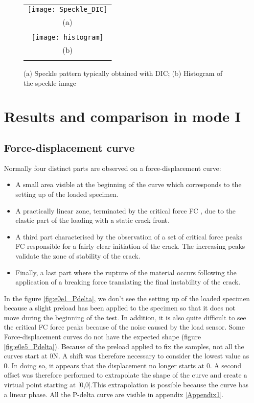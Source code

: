 \begin{figure}[htp]
	\centering
	\begin{tabular}{c}
		\texttt{[image: Speckle\_DIC]} \\
		(a) \\
		\\
		\texttt{[image: histogram]} \\
		(b) \\
		\\
	\end{tabular}
	\caption{(a) Speckle pattern typically obtained with DIC; (b) Histogram of the speckle image}
	\label{fig:Speckle_DIC}
\end{figure}

\section{Results and comparison in mode I}

\subsection{Force-displacement curve}

Normally four distinct parts are observed on a force-displacement curve:

\begin{itemize}
	\item A small area visible at the beginning of the curve which corresponds to the setting up of the loaded specimen. 
	\item A practically linear zone, terminated by the critical force FC , due to the elastic part of the loading with a static crack front.
	\item A third part characterised by the observation of a set of critical force peaks FC responsible for a fairly clear initiation of the crack. The increasing peaks validate the zone of stability of the crack.
	\item Finally, a last part where the rupture of the material occurs following the application of a breaking force translating the final instability of the crack.
\end{itemize}

 In the figure \ref{fig:e0e1_Pdelta}, we don't see the setting up of the loaded specimen because a slight preload has been applied to the specimen so that it does not move during the beginning of the test. In addition, it is also quite difficult to see the critical FC force peaks because of the noise caused by the load sensor.
 Some Force-displacement curves do not have the expected shape (figure \ref{fig:e0e5_Pdelta}). Because of the preload applied to fix the samples, not all the curves start at 0N. A shift was therefore necessary to consider the lowest value as 0. In doing so, it appears that the displacement no longer starts at 0. A second offset was therefore performed to extrapolate the shape of the curve and create a virtual point starting at [0,0].This extrapolation is possible because the curve has a linear phase. All the P-delta curve are visible in appendix \ref{Appendix1}.


